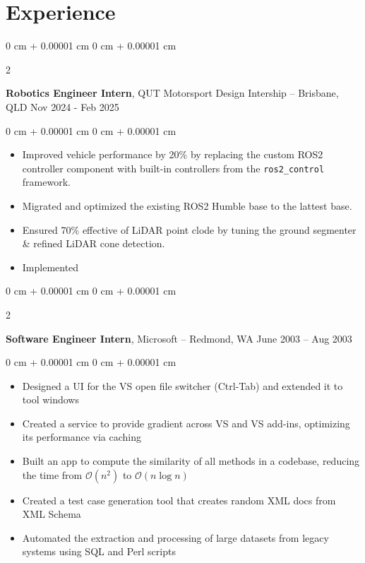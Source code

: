 \documentclass[10pt, letterpaper]{article}
\newenvironment{highlights}{
    \begin{itemize}[
        topsep=0.10 cm,
        parsep=0.10 cm,
        partopsep=0pt,
        itemsep=0pt,
        leftmargin=0 cm + 10pt
    ]
}{
    \end{itemize}
} %
\newenvironment{onecolentry}{
    \begin{adjustwidth}{
        0 cm + 0.00001 cm
    }{
        0 cm + 0.00001 cm
    }
}{
    \end{adjustwidth}
} %
\newenvironment{twocolentry}[2][]{
    \onecolentry
    \def\secondColumn{#2}
    \setcolumnwidth{\fill, 4.5 cm}
    \begin{paracol}{2}
}{
    \switchcolumn \raggedleft \secondColumn
    \end{paracol}
    \endonecolentry
} %
\begin{document}
\section{Experience}

\begin{twocolentry}{
            Nov 2024 - Feb 2025
      }
      \textbf{Robotics Engineer Intern}, QUT Motorsport Design Intership -- Brisbane, QLD\end{twocolentry}

\vspace{0.10 cm}
\begin{onecolentry}

      \begin{highlights}
            \item Improved vehicle performance by 20\% by replacing the custom ROS2 controller component with built-in controllers 
            from the \texttt{ros2\_control} framework.
            \item Migrated and optimized the existing ROS2 Humble base to the lattest base.
            \item Ensured 70\% effective of LiDAR point clode by tuning the ground segmenter \& refined LiDAR cone detection.
            \item Implemented 
            
      \end{highlights}
\end{onecolentry}

\vspace{0.4 cm}

\begin{twocolentry}{
            June 2003 – Aug 2003
      }
      \textbf{Software Engineer Intern}, Microsoft -- Redmond, WA\end{twocolentry}

\vspace{0.10 cm}
\begin{onecolentry}
      \begin{highlights}
            \item Designed a UI for the VS open file switcher (Ctrl-Tab) and extended it to tool
            windows
            \item Created a service to provide gradient across VS and VS add-ins, optimizing its
            performance via caching
            \item Built an app to compute the similarity of all methods in a codebase, reducing
            the time from $\mathcal{O}(n^2)$ to $\mathcal{O}(n \log n)$
            \item Created a test case generation tool that creates random XML docs from XML
            Schema
            \item Automated the extraction and processing of large datasets from legacy systems
            using SQL and Perl scripts
      \end{highlights}
\end{onecolentry}
\end{document}
